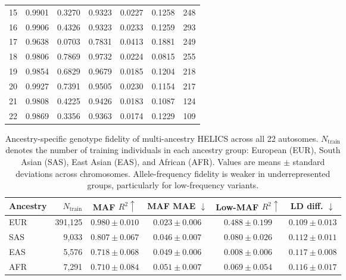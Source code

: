 \documentclass{article}
\begin{document}
\begin{table}[t]
\begin{tabular}{c r r r r r r}
15 & 0.9901 & 0.3270 & 0.9323 & 0.0227 & 0.1258 & 248 \\
16 & 0.9906 & 0.4326 & 0.9323 & 0.0233 & 0.1259 & 293 \\
17 & 0.9638 & 0.0703 & 0.7831 & 0.0413 & 0.1881 & 249 \\
18 & 0.9806 & 0.7869 & 0.9732 & 0.0224 & 0.0815 & 255 \\
19 & 0.9854 & 0.6829 & 0.9679 & 0.0185 & 0.1204 & 218 \\
20 & 0.9927 & 0.7391 & 0.9505 & 0.0230 & 0.1154 & 217 \\
21 & 0.9808 & 0.4225 & 0.9426 & 0.0183 & 0.1087 & 124 \\
22 & 0.9869 & 0.3356 & 0.9363 & 0.0174 & 0.1229 & 109 \\
\bottomrule
\end{tabular}
\end{table}


\begin{table}[t]
\centering
\caption{
Ancestry-specific genotype fidelity of multi-ancestry HELICS across all 22 autosomes. \(N_{\mathrm{train}}\) denotes the number of training individuals in each ancestry group: European (EUR), South Asian (SAS), East Asian (EAS), and African (AFR). Values are means \(\pm\) standard deviations across chromosomes. Allele-frequency fidelity is weaker in underrepresented groups, particularly for low-frequency variants.}
\label{tab:ancestry_fidelity}
\small
\setlength{\tabcolsep}{4pt}
\begin{tabular}{lrcccc}
\toprule
\textbf{Ancestry}
& \(N_{\mathrm{train}}\)
& \textbf{MAF} \(R^2 \uparrow\)
& \textbf{MAF MAE} \(\downarrow\)
& \textbf{Low-MAF} \(R^2 \uparrow\)
& \textbf{LD diff.} \(\downarrow\) \\
\midrule
EUR & 391{,}125 & \(0.980\pm0.010\) & \(0.023\pm0.006\) & \(0.488\pm0.199\) & \(0.109\pm0.013\) \\
SAS & 9{,}033   & \(0.807\pm0.067\) & \(0.046\pm0.007\) & \(0.080\pm0.026\) & \(0.112\pm0.011\) \\
EAS & 5{,}576   & \(0.718\pm0.068\) & \(0.049\pm0.006\) & \(0.008\pm0.006\) & \(0.117\pm0.008\) \\
AFR & 7{,}291   & \(0.710\pm0.084\) & \(0.051\pm0.007\) & \(0.069\pm0.054\) & \(0.116\pm0.017\) \\
\bottomrule
\end{tabular}
\end{table}
\end{document}
